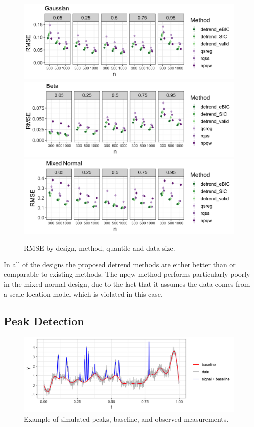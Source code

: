 \documentclass[12pt]{article}
\begin{document}
	\begin{figure}
		\caption{RMSE by design, method, quantile and data size.}
		\includegraphics[width=\linewidth]{Figures/gaus_mse.png}	
		\includegraphics[width=\linewidth]{Figures/shapebeta_mse.png}
		\includegraphics[width=\linewidth]{Figures/mixednorm_mse.png}
	\end{figure}
	In all of the designs the proposed detrend methods are either better than or comparable to existing methods. The npqw method performs particularly poorly in the mixed normal design, due to the fact that it assumes the data comes from a scale-location model which is violated in this case. 
	
	\subsection{Peak Detection}
	\begin{figure}[h]
		\caption{Example of simulated peaks, baseline, and observed measurements.}
		\includegraphics[width = \linewidth]{Figures/ex_peaks.png}
	\end{figure}
\end{document}

